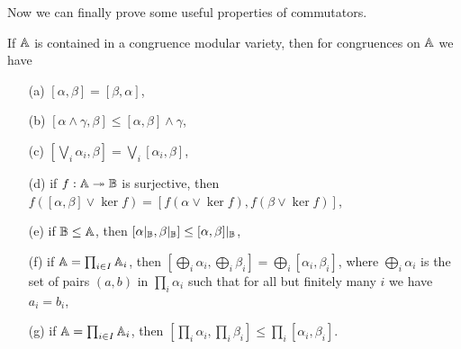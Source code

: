 \documentclass[letterpaper,11pt]{article}
\begin{document}
Now we can finally prove some useful properties of commutators.

\begin{prop}\label{mod-commutator} If $\mathbb{A}$ is contained in a congruence modular variety, then for congruences on $\mathbb{A}$ we have
\begin{itemize}
\item[(a)] $[\alpha,\beta] = [\beta,\alpha]$,

\item[(b)] $[\alpha \wedge \gamma, \beta] \le [\alpha,\beta]\wedge \gamma$,

\item[(c)] $[\bigvee_i \alpha_i, \beta] = \bigvee_i[\alpha_i,\beta]$,

\item[(d)] if $f : \mathbb{A} \twoheadrightarrow \mathbb{B}$ is surjective, then $f([\alpha,\beta]\vee \ker f) = [f(\alpha \vee \ker f), f(\beta \vee \ker f)]$,

\item[(e)] if $\mathbb{B} \le \mathbb{A}$, then $[\alpha|_{\mathbb{B}},\beta|_{\mathbb{B}}] \le [\alpha,\beta]|_{\mathbb{B}}$,

\item[(f)] if $\mathbb{A} = \prod_{i \in I} \mathbb{A}_i$, then $[\bigoplus_i \alpha_i, \bigoplus_i \beta_i] = \bigoplus_i[\alpha_i,\beta_i]$, where $\bigoplus_i \alpha_i$ is the set of pairs $(a,b)$ in $\prod_i \alpha_i$ such that for all but finitely many $i$ we have $a_i = b_i$,

\item[(g)] if $\mathbb{A} = \prod_{i \in I} \mathbb{A}_i$, then $[\prod_i \alpha_i, \prod_i \beta_i] \le \prod_i [\alpha_i, \beta_i]$.
\end{itemize}
\end{prop}
\end{document}

